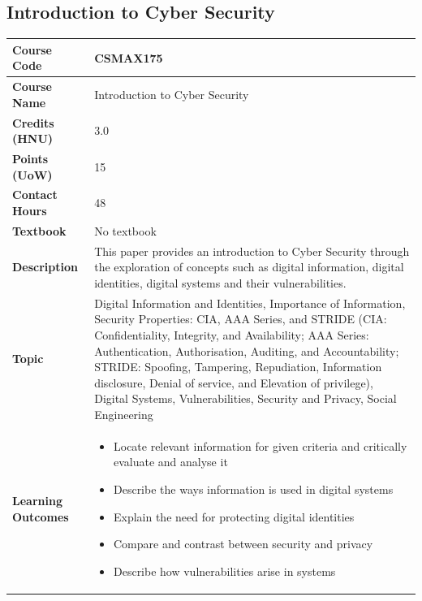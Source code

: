 \documentclass{article}
\begin{document}
\subsection[CSMAX175 Introduction to Cyber Security]{Introduction to Cyber Security}
\renewcommand{\arraystretch}{1.5} %
\begin{longtable}{|p{3cm}|p{10cm}|}
\hline
\textbf{Course Code} & CSMAX175 \\
\hline
\textbf{Course Name} & Introduction to Cyber Security \\
\hline
\textbf{Credits (HNU)} & 3.0 \\
\hline
\textbf{Points (UoW)} & 15 \\
\hline
\textbf{Contact Hours} & 48 \\
\hline
\textbf{Textbook} & No textbook \\
\hline
\textbf{Description} & This paper provides an introduction to Cyber Security through the exploration of concepts such as digital information, digital identities, digital systems and their vulnerabilities.\\
\hline
\textbf{Topic} & Digital Information and Identities, 
Importance of Information, 
Security Properties: CIA, AAA Series, and STRIDE
(CIA: Confidentiality, Integrity, and Availability; AAA Series: Authentication, Authorisation, Auditing, and Accountability; STRIDE: Spoofing, Tampering, Repudiation, Information disclosure, Denial of service, and Elevation of privilege), 
Digital Systems, 
Vulnerabilities, 
Security and Privacy, 
Social Engineering\\
\hline
\textbf{Learning Outcomes} & 
    \begin{itemize}
        \item Locate relevant information for given criteria and critically evaluate and analyse it
        \item Describe the ways information is used in digital systems
        \item Explain the need for protecting digital identities
        \item Compare and contrast between security and privacy
        \item Describe how vulnerabilities arise in systems
    \end{itemize} \\
\hline
\end{longtable}
\end{document}
